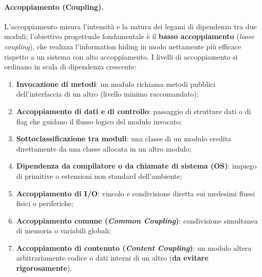 \documentclass[12pt]{extarticle}
\begin{document}
\paragraph{Accoppiamento (Coupling).}
L'accoppiamento misura l'intensità e la natura dei legami di dipendenza tra due moduli; l'obiettivo progettuale fondamentale è il \textbf{basso accoppiamento} (\textit{loose coupling}), che realizza l'information hiding in modo nettamente più efficace rispetto a un sistema con alto accoppiamento. 
I livelli di accoppiamento si ordinano in scala di dipendenza crescente: 
\begin{enumerate}
    \item \textbf{Invocazione di metodi}: un modulo richiama metodi pubblici dell'interfaccia di un altro (livello minimo raccomandato); 
    \item \textbf{Accoppiamento di dati e di controllo}: passaggio di strutture dati o di flag che guidano il flusso logico del modulo invocato; 
    \item \textbf{Sottoclassificazione tra moduli}: una classe di un modulo eredita direttamente da una classe allocata in un altro modulo; 
    \item \textbf{Dipendenza da compilatore o da chiamate di sistema (OS)}: impiego di primitive o estensioni non standard dell'ambiente; 
    \item \textbf{Accoppiamento di I/O}: vincolo e condivisione diretta sui medesimi flussi fisici o periferiche; 
    \item \textbf{Accoppiamento comune (\textit{Common Coupling})}: condivisione simultanea di memoria o variabili globali; 
    \item \textbf{Accoppiamento di contenuto (\textit{Content Coupling})}: un modulo altera arbitrariamente codice o dati interni di un altro (\textbf{da evitare rigorosamente}). 
\end{enumerate}
\end{document}
